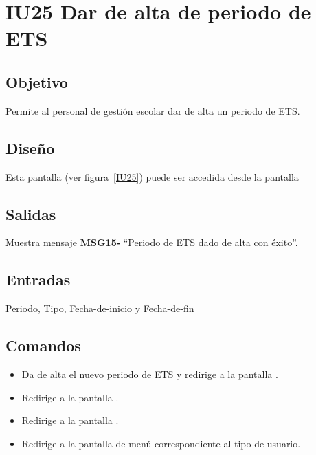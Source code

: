 
\section{IU25 Dar de alta de periodo de ETS}
\subsection{Objetivo}
    Permite al personal de gestión escolar dar de alta un periodo de ETS.
\subsection{Diseño}
    Esta pantalla  (ver figura~\ref{IU25}) puede ser accedida desde la pantalla 

\subsection{Salidas}
Muestra mensaje {\bf MSG15-} ``Periodo de ETS  dado de alta con éxito''.
\subsection{Entradas}
\hyperlink{Periodo de ETS.Periodo}{Periodo}, \hyperlink{Periodo-de-ETS.Tipo}{Tipo}, \hyperlink{Periodo-de-ETS.Fecha-de-inicio}{Fecha-de-inicio} y \hyperlink{Periodo-de-ETS.Fecha-de-fin}{Fecha-de-fin}
\subsection{Comandos}
\begin{itemize}
    \item {} Da de alta el nuevo periodo de ETS y redirige a la pantalla .
    \item {} Redirige a la pantalla .
    \item {} Redirige a la pantalla .
    \item {} Redirige a la pantalla de menú correspondiente al tipo de usuario.
    
\end{itemize}

